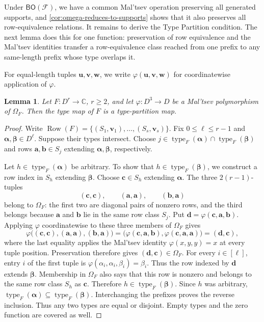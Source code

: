 \documentclass[11pt,letterpaper,onecolumn]{article}
\theoremstyle{plain}
\newtheorem{lemma}[lemma]{Lemma}
\theoremstyle{definition}
\theoremstyle{remark}
\newcommand{\AlgNums}{\mathbb C}
\newcommand{\cF}{\mathcal F}
\newcommand{\BO}{\mathsf{BO}}
\newcommand{\RowEq}[1]{\Omega_{#1}}
\DeclareMathOperator{\typeop}{type}
\DeclareMathOperator{\Row}{Row}
\begin{document}
Under $\BO(\cF)$, we have a common Mal'tsev operation preserving all
generated supports, and \cref{cor:omega-reduces-to-supports} shows that it
also preserves all row-equivalence relations.  It remains to derive the
Type Partition condition.  The next lemma does this for one function:
preservation of row equivalence and the Mal'tsev identities transfer a
row-equivalence class reached from one prefix to any same-length prefix
whose type overlaps it.

For equal-length tuples $\mathbf u,\mathbf v,\mathbf w$, we write
$\varphi(\mathbf u,\mathbf v,\mathbf w)$ for coordinatewise application of $\varphi$.

\begin{lemma}
\label{lem:omega-implies-type}
Let $F:D^r\to\AlgNums$, $r\ge2$, and let $\varphi:D^3\to D$ be a Mal'tsev
polymorphism of $\RowEq F$.  Then the type map of $F$ is a
type-partition map.
\end{lemma}

\begin{proof}
Write $\Row(F)=\{(S_1,\mathbf v_1),\ldots,(S_s,\mathbf v_s)\}$. Fix $0\le\ell\le r-1$ and
$\boldsymbol\alpha,\boldsymbol\beta\in D^\ell$.  Suppose their types
intersect.  Choose $j\in\typeop_F(\boldsymbol\alpha) \cap\typeop_F(\boldsymbol\beta)$ and rows $\mathbf a,\mathbf b\in S_j$ extending
$\boldsymbol\alpha,\boldsymbol\beta$, respectively.

Let $h\in\typeop_F(\boldsymbol\alpha)$ be arbitrary.  To show that
$h\in\typeop_F(\boldsymbol\beta)$, we construct a row index in $S_h$
extending $\boldsymbol\beta$.  Choose $\mathbf c\in S_h$ extending
$\boldsymbol\alpha$.  The three
$2(r-1)$-tuples
\[
  (\mathbf c,\mathbf c),\qquad
  (\mathbf a,\mathbf a),\qquad
  (\mathbf b,\mathbf a)
\]
belong to $\RowEq F$: the first two are diagonal pairs of nonzero rows, and
the third belongs because $\mathbf a$ and $\mathbf b$ lie in the same row
class $S_j$.  Put $\mathbf d=\varphi(\mathbf c,\mathbf a,\mathbf b)$.  Applying
$\varphi$ coordinatewise to these three members of $\RowEq F$ gives
\[
  \varphi\bigl((\mathbf c,\mathbf c),(\mathbf a,\mathbf a),(\mathbf b,\mathbf a)\bigr)
  =\bigl(\varphi(\mathbf c,\mathbf a,\mathbf b),\varphi(\mathbf c,\mathbf a,\mathbf a)\bigr)
  =(\mathbf d,\mathbf c),
\]
where the last equality applies the Mal'tsev identity $\varphi(x,y,y)=x$ at every
tuple position.  Preservation therefore gives $(\mathbf d,\mathbf c)\in\RowEq F$. For every $i\in[\ell]$, entry $i$ of the first tuple is $\varphi(\alpha_i,\alpha_i,\beta_i)=\beta_i$. Thus the row indexed by $\mathbf d$ extends $\boldsymbol\beta$.
Membership in $\RowEq F$ also says that this row is
nonzero and belongs to the same row class $S_h$ as
$\mathbf c$.  Therefore $h\in\typeop_F(\boldsymbol\beta)$.  Since $h$ was
arbitrary, $\typeop_F(\boldsymbol\alpha) \subseteq\typeop_F(\boldsymbol\beta)$. Interchanging the prefixes proves the reverse inclusion.  Thus any two types
are equal or disjoint.  Empty types and the zero function are covered as well.
\end{proof}
\end{document}
